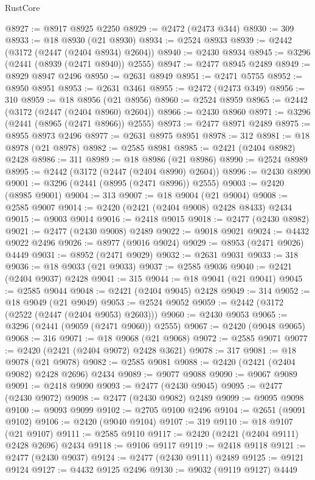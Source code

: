 \begin{lexlean}{RustCore}
\begin{coremodule}
@8927 := @8917 @8925 @2250
@8929 := @2472 (@2473 @344)
@8930 := 309
@8933 := @18 @8930 (@21 @8930)
@8934 := @2524 @8933
@8939 := @2442 (@3172 (@2447 (@2404 @8934) @2604))
@8940 := @2430 @8934
@8945 := @3296 (@2441 (@8939 (@2471 @8940)) @2555)
@8947 := @2477 @8945 @2489
@8949 := @8929 @8947 @2496
@8950 := @2631 @8949
@8951 := @2471 @5755
@8952 := @8950 @8951
@8953 := @2631 @3461
@8955 := @2472 (@2473 @349)
@8956 := 310
@8959 := @18 @8956 (@21 @8956)
@8960 := @2524 @8959
@8965 := @2442 (@3172 (@2447 (@2404 @8960) @2604))
@8966 := @2430 @8960
@8971 := @3296 (@2441 (@8965 (@2471 @8966)) @2555)
@8973 := @2477 @8971 @2489
@8975 := @8955 @8973 @2496
@8977 := @2631 @8975 @8951
@8978 := 312
@8981 := @18 @8978 (@21 @8978)
@8982 := @2585 @8981
@8985 := @2421 (@2404 @8982) @2428
@8986 := 311
@8989 := @18 @8986 (@21 @8986)
@8990 := @2524 @8989
@8995 := @2442 (@3172 (@2447 (@2404 @8990) @2604))
@8996 := @2430 @8990
@9001 := @3296 (@2441 (@8995 (@2471 @8996)) @2555)
@9003 := @2420 (@8985 @9001)
@9004 := 313
@9007 := @18 @9004 (@21 @9004)
@9008 := @2585 @9007
@9014 := @2420 (@2421 (@2404 @9008) @2428 @8433) @2434
@9015 := @9003 @9014
@9016 := @2418 @9015
@9018 := @2477 (@2430 @8982)
@9021 := @2477 (@2430 @9008) @2489
@9022 := @9018 @9021
@9024 := @4432 @9022 @2496
@9026 := @8977 (@9016 @9024)
@9029 := @8953 (@2471 @9026) @4449
@9031 := @8952 (@2471 @9029)
@9032 := @2631 @9031
@9033 := 318
@9036 := @18 @9033 (@21 @9033)
@9037 := @2585 @9036
@9040 := @2421 (@2404 @9037) @2428
@9041 := 315
@9044 := @18 @9041 (@21 @9041)
@9045 := @2585 @9044
@9048 := @2421 (@2404 @9045) @2428
@9049 := 314
@9052 := @18 @9049 (@21 @9049)
@9053 := @2524 @9052
@9059 := @2442 (@3172 (@2522 (@2447 (@2404 @9053) @2603)))
@9060 := @2430 @9053
@9065 := @3296 (@2441 (@9059 (@2471 @9060)) @2555)
@9067 := @2420 (@9048 @9065)
@9068 := 316
@9071 := @18 @9068 (@21 @9068)
@9072 := @2585 @9071
@9077 := @2420 (@2421 (@2404 @9072) @2428 @3621)
@9078 := 317
@9081 := @18 @9078 (@21 @9078)
@9082 := @2585 @9081
@9088 := @2420 (@2421 (@2404 @9082) @2428 @2696) @2434
@9089 := @9077 @9088
@9090 := @9067 @9089
@9091 := @2418 @9090
@9093 := @2477 (@2430 @9045)
@9095 := @2477 (@2430 @9072)
@9098 := @2477 (@2430 @9082) @2489
@9099 := @9095 @9098
@9100 := @9093 @9099
@9102 := @2705 @9100 @2496
@9104 := @2651 (@9091 @9102)
@9106 := @2420 (@9040 @9104)
@9107 := 319
@9110 := @18 @9107 (@21 @9107)
@9111 := @2585 @9110
@9117 := @2420 (@2421 (@2404 @9111) @2428 @2696) @2434
@9118 := @9106 @9117
@9119 := @2418 @9118
@9121 := @2477 (@2430 @9037)
@9124 := @2477 (@2430 @9111) @2489
@9125 := @9121 @9124
@9127 := @4432 @9125 @2496
@9130 := @9032 (@9119 @9127) @4449

\end{coremodule}
\end{lexlean}
